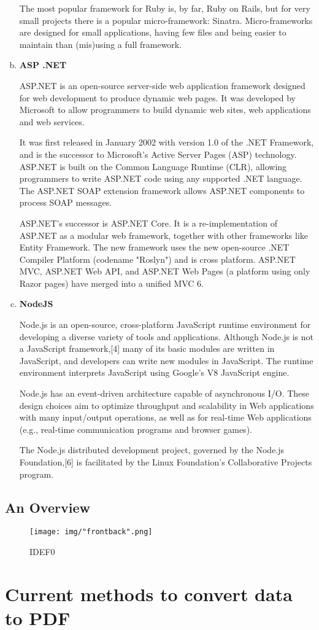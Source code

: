 \documentclass[paper.tex]{subfiles}
\begin{document}
\begin{enumerate}[a.]
  The most popular framework for Ruby is, by far, Ruby on Rails, but for very small projects there is a popular micro-framework: Sinatra.
  Micro-frameworks are designed for small applications, having few files and being easier to maintain than (mis)using a full framework.
  \medbreak

\item \textbf{ASP .NET}
  \par
  ASP.NET is an open-source server-side web application framework designed for web development to produce dynamic web pages. It was developed by Microsoft to allow programmers to build dynamic web sites, web applications and web services.

  It was first released in January 2002 with version 1.0 of the .NET Framework, and is the successor to Microsoft's Active Server Pages (ASP) technology. ASP.NET is built on the Common Language Runtime (CLR), allowing programmers to write ASP.NET code using any supported .NET language. The ASP.NET SOAP extension framework allows ASP.NET components to process SOAP messages.

  ASP.NET's successor is ASP.NET Core. It is a re-implementation of ASP.NET as a modular web framework, together with other frameworks like Entity Framework. The new framework uses the new open-source .NET Compiler Platform (codename "Roslyn") and is cross platform. ASP.NET MVC, ASP.NET Web API, and ASP.NET Web Pages (a platform using only Razor pages) have merged into a unified MVC 6.
  \medbreak

\item \textbf{NodeJS}
  \par
  Node.js is an open-source, cross-platform JavaScript runtime environment for developing a diverse variety of tools and applications. Although Node.js is not a JavaScript framework,[4] many of its basic modules are written in JavaScript, and developers can write new modules in JavaScript. The runtime environment interprets JavaScript using Google's V8 JavaScript engine.

  Node.js has an event-driven architecture capable of asynchronous I/O. These design choices aim to optimize throughput and scalability in Web applications with many input/output operations, as well as for real-time Web applications (e.g., real-time communication programs and browser games).

  The Node.js distributed development project, governed by the Node.js Foundation,[6] is facilitated by the Linux Foundation's Collaborative Projects program.
\end{enumerate}

\newpage
\subsection{An Overview}

\begin{figure}[H]
\centering
\texttt{[image: img/"frontback".png]}
\caption{IDEF0}
\end{figure}

\section{Current methods to convert data to PDF}
\end{document}

